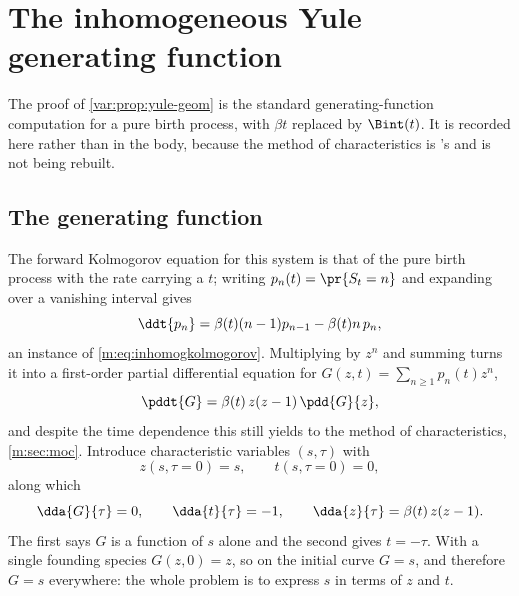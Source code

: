 
\section{The inhomogeneous Yule generating function}
\label{var:app:pgf}

The proof of \cref{var:prop:yule-geom} is the standard generating-function
computation for a pure birth process, with $\beta t$ replaced by
$\Bint(t)$. It is recorded here rather than in the body, because the
method of characteristics is \ChM{}'s and is not being rebuilt.

\subsection{The generating function}
\label{var:sec:pgf}

The forward Kolmogorov equation for this system is that of the pure birth
process with the rate carrying a $t$; writing $p_n(t)=\pr{S_t=n}$ and
expanding over a vanishing interval gives
\begin{equation}
\ddt{p_n}=\beta(t)(n-1)p_{n-1}-\beta(t)n\,p_n,
\label{var:eq:fke}
\end{equation}
an instance of \cref{m:eq:inhomogkolmogorov}. Multiplying by $z^n$ and
summing turns it into a first-order partial differential equation for
$G(z,t)=\sum_{n\ge1}p_n(t)z^n$,
\begin{equation}
\pddt{G}=\beta(t)\,z(z-1)\,\pdd{G}{z},
\label{var:eq:pgfpde}
\end{equation}
and despite the time dependence this still yields to the method of
characteristics, \cref{m:sec:moc}. Introduce characteristic variables
$(s,\tau)$ with
\begin{equation}
z(s,\tau=0)=s,\qquad t(s,\tau=0)=0,
\label{var:eq:charics}
\end{equation}
along which
\begin{equation}
\dda{G}{\tau}=0,
\qquad
\dda{t}{\tau}=-1,
\qquad
\dda{z}{\tau}=\beta(t)\,z(z-1).
\label{var:eq:chareqs}
\end{equation}
The first says $G$ is a function of $s$ alone and the second gives $t=-\tau$.
With a single founding species $G(z,0)=z$, so on the initial curve $G=s$,
and therefore $G=s$ everywhere: the whole problem is to express $s$ in terms
of $z$ and $t$.

